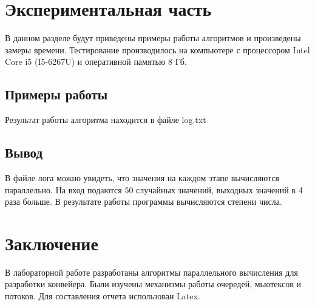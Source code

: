 \documentclass[12pt]{article}
\begin{document}
\section{Экспериментальная часть}
В данном разделе будут приведены примеры работы алгоритмов и произведены замеры времени. Тестирование производилось на компьютере с процессором Intel Core i5 (I5-6267U) и оперативной памятью 8 Гб. 
\subsection{Примеры работы}
Результат работы алгоритма находится в файле log.txt

\newpage
\subsection{Вывод}
В файле лога можно увидеть, что значения на каждом этапе вычисляются параллельно. 
На вход подаются 50 случайных значений, выходных значений в 4 раза больше. В результате работы программы вычисляются степени числа. 

\newpage
\section{Заключение}
В лабораторной работе разработаны алгоритмы параллельного вычисления для разработки конвейера. Были изучены механизмы работы очередей, мьютексов и потоков. Для составления отчета использован Latex.
\\
\end{document}
